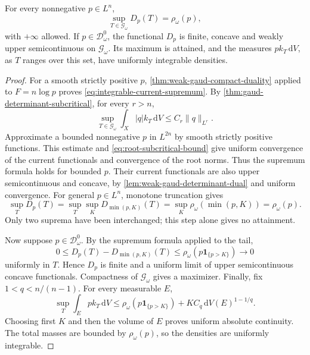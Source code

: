 \begin{theorem}\label{thm:integrable-current-attainment}
For every nonnegative $p\in L^n$,
\begin{equation}\label{eq:integrable-current-supremum}
 \sup_{T\in\mathscr G_\omega}D_p(T)=\rho_\omega(p),
\end{equation}
with $+\infty$ allowed. If $p\in\mathcal D_\omega^0$, the functional $D_p$ is finite, concave and weakly upper semicontinuous on $\mathscr G_\omega$. Its maximum is attained, and the measures $p k_T\,\mathrm{d}V$, as $T$ ranges over this set, have uniformly integrable densities.
\end{theorem}
\begin{proof}
For a smooth strictly positive $p$, \cref{thm:weak-gaud-compact-duality} applied to $F=n\log p$ proves \eqref{eq:integrable-current-supremum}. By \cref{thm:gaud-determinant-subcritical}, for every $r>n$,
\begin{equation}\label{eq:current-root-test-bound}
 \sup_{T\in\mathscr G_\omega}\int_X|q| k_T\,\mathrm{d}V
       \leq C_r\|q\|_{L^r}.
\end{equation}
Approximate a bounded nonnegative $p$ in $L^{2n}$ by smooth strictly positive functions. This estimate and \eqref{eq:root-subcritical-bound} give uniform convergence of the current functionals and convergence of the root norms. Thus the supremum formula holds for bounded $p$. Their current functionals are also upper semicontinuous and concave, by \cref{lem:weak-gaud-determinant-dual} and uniform convergence. For general $p\in L^n$, monotone truncation gives
\[
 \sup_T D_p(T)=\sup_T\sup_K D_{\min(p,K)}(T)
       =\sup_K\rho_\omega(\min(p,K))=\rho_\omega(p).
\]
Only two suprema have been interchanged; this step alone gives no attainment.

Now suppose $p\in\mathcal D_\omega^0$. By the supremum formula applied to the tail,
\[
 0\leq D_p(T)-D_{\min(p,K)}(T)
 \leq \rho_\omega(p\mathbf1_{\{p>K\}})\longrightarrow0
\]
uniformly in $T$. Hence $D_p$ is finite and a uniform limit of upper semicontinuous concave functionals. Compactness of $\mathscr G_\omega$ gives a maximizer. Finally, fix $1<q<n/(n-1)$. For every measurable $E$,
\[
 \sup_T\int_Ep k_T\,\mathrm{d}V
 \leq\rho_\omega(p\mathbf1_{\{p>K\}})
       +K C_q\,\mathrm{d}V(E)^{1-1/q}.
\]
Choosing first $K$ and then the volume of $E$ proves uniform absolute continuity. The total masses are bounded by $\rho_\omega(p)$, so the densities are uniformly integrable.
\end{proof}

